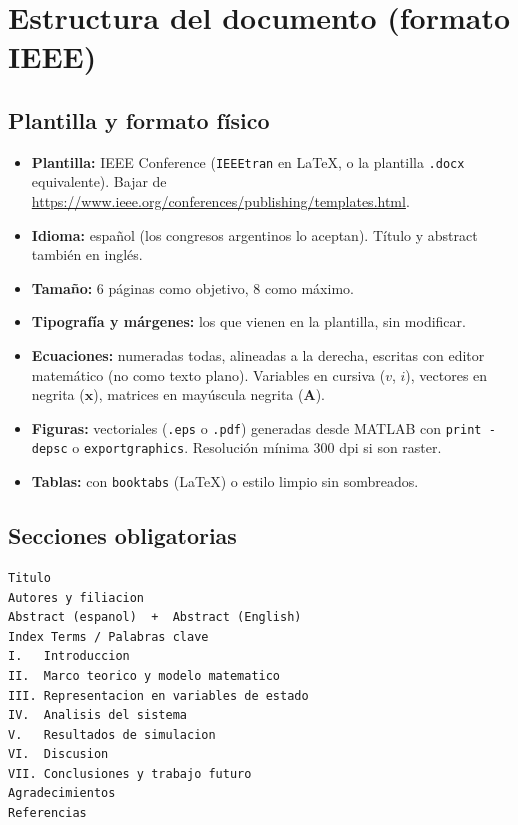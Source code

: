 \documentclass[11pt,a4paper]{article}
\begin{document}
\hrulefill

\section{Estructura del documento (formato IEEE)}

\subsection{Plantilla y formato físico}

\begin{itemize}
    \item \textbf{Plantilla:} IEEE Conference (\texttt{IEEEtran} en LaTeX, o la plantilla \texttt{.docx} equivalente). Bajar de \url{https://www.ieee.org/conferences/publishing/templates.html}.
    \item \textbf{Idioma:} español (los congresos argentinos lo aceptan). Título y abstract también en inglés.
    \item \textbf{Tamaño:} 6 páginas como objetivo, 8 como máximo.
    \item \textbf{Tipografía y márgenes:} los que vienen en la plantilla, sin modificar.
    \item \textbf{Ecuaciones:} numeradas todas, alineadas a la derecha, escritas con editor matemático (no como texto plano). Variables en cursiva ($v$, $i$), vectores en negrita ($\mathbf{x}$), matrices en mayúscula negrita ($\mathbf{A}$).
    \item \textbf{Figuras:} vectoriales (\texttt{.eps} o \texttt{.pdf}) generadas desde MATLAB con \texttt{print -depsc} o \texttt{exportgraphics}. Resolución mínima 300 dpi si son raster.
    \item \textbf{Tablas:} con \texttt{booktabs} (LaTeX) o estilo limpio sin sombreados.
\end{itemize}

\subsection{Secciones obligatorias}

\begin{lstlisting}[style=plain]
Titulo
Autores y filiacion
Abstract (espanol)  +  Abstract (English)
Index Terms / Palabras clave
I.   Introduccion
II.  Marco teorico y modelo matematico
III. Representacion en variables de estado
IV.  Analisis del sistema
V.   Resultados de simulacion
VI.  Discusion
VII. Conclusiones y trabajo futuro
Agradecimientos
Referencias
\end{lstlisting}
\end{document}
